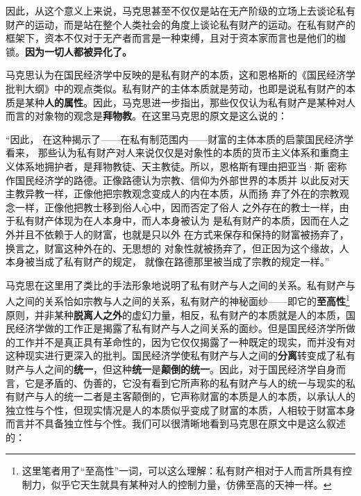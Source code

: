 \documentclass[a4paper,twoside,12pt]{ctexart}
\begin{document}
因此，从这个意义上来说，马克思甚至不仅仅是站在无产阶级的立场上去谈论私有财产的运动，而是站在整个人类社会的角度上谈论私有财产的运动。在私有财产的框架下，资本不仅对于无产者而言是一种束缚，且对于资本家而言也是他们的枷锁。\textbf{因为一切人都被异化了。}

马克思认为在国民经济学中反映的是私有财产的本质，这和恩格斯的《国民经济学批判大纲》中的观点类似。私有财产的主体本质就是劳动，也即是说私有财产的本质是某种\textbf{人的属性}。因此，马克思进一步指出，那些仅仅认为私有财产是某种对人而言的对象物的观念是\textbf{拜物教}。在这里马克思的原文是这么说的：

\begin{fangsong}
“因此，
在这种揭示了——在私有制范围内——财富的主体本质的启蒙国民经济学看来，
那些认为私有财产对人来说仅仅是对象性的本质的货币主义体系和重商主
义体系地拥护者，是拜物教徒、天主教徒。所以，恩格斯有理由把亚当·斯
密称作国民经济学的路德。正像路德认为宗教、信仰为外部世界的本质并
以此反对天主教异教一样，正像他把宗教观念变成人的内在本质，从而扬
弃了外在的宗教观念一样，正像他把教士移到俗人心中，因而否定了俗人
之外存在的教士一样，由于私有财产体现为在人本身中，而人本身被认为
是私有财产的本质，因而在人之外并且不依赖于人的财富，也就是只以外
在方式来保存和保持的财富被扬弃了，换言之，财富这种外在的、无思想的
对象性就被扬弃了，但正因为这个缘故，人本身被当成了私有财产的规定，
就像在路德那里被当成了宗教的规定一样。”
\end{fangsong}

马克思在这里用了类比的手法形象地说明了私有财产与人之间的关系。私有财产与人之间的关系恰如宗教与人之间的关系，私有财产的神秘面纱——即它的\textbf{至高性}\footnote{这里笔者用了“至高性”一词，可以这么理解：私有财产相对于人而言所具有控制力，似乎它天生就具有某种对人的控制力量，仿佛至高的天神一样。}原则，并非某种\textbf{脱离人之外}的虚幻力量，相反，私有财产的本质就是人的本质，国民经济学做的工作正是揭露了私有财产与人之间关系的面纱。但是国民经济学所做的工作并不是真正具有革命性的，因为它仅仅揭露了一种既定的现实，而并没有对这种现实进行更深入的批判。国民经济学使私有财产与人之间的\textbf{分离}转变成了私有财产与人之间的\textbf{统一}，但这种\textbf{统一}是\textbf{颠倒的统一}。因此，对于国民经济学自身而言，它是矛盾的、伪善的，它没有看到它所声称的私有财产与人的统一与现实的私有财产与人的统一二者是主客颠倒的，它声称财富的本质是人的本质，以承认人的独立性与个性，但现实情况是人的本质似乎变成了财富的本质，人相较于财富本身而言并不具备独立性与个性。我们可以很清晰地看到马克思在原文中是这么叙述的：
\end{document}
